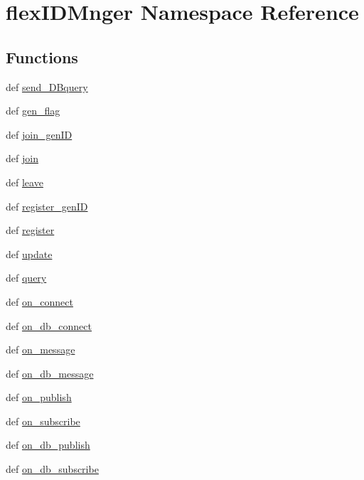 \hypertarget{namespaceflexIDMnger}{\section{flex\-I\-D\-Mnger Namespace Reference}
\label{namespaceflexIDMnger}
}
\subsection*{Functions}
\begin{DoxyCompactItemize}
\item 
def \hyperlink{namespaceflexIDMnger_a2a7c7e9bf32f6eb60a156d39cae2b83e}{send\-\_\-\-D\-Bquery}
\item 
def \hyperlink{namespaceflexIDMnger_aac6ecfc0a2fe51bdd01b61ccd58eb91f}{gen\-\_\-flag}
\item 
def \hyperlink{namespaceflexIDMnger_a0d83ec0ab91ef22408468b11538747d9}{join\-\_\-gen\-I\-D}
\item 
def \hyperlink{namespaceflexIDMnger_a7d48306b9aecbe1ad4aef8c58c6a1690}{join}
\item 
def \hyperlink{namespaceflexIDMnger_a52817e4c22e96db951b167be5d1f2bc5}{leave}
\item 
def \hyperlink{namespaceflexIDMnger_a8da198b7fa1207a7122130fb50adb675}{register\-\_\-gen\-I\-D}
\item 
def \hyperlink{namespaceflexIDMnger_ac74ae56a6ac7c8ce2adc5a2b4da7087d}{register}
\item 
def \hyperlink{namespaceflexIDMnger_adedec16e54018954285353ecad9197db}{update}
\item 
def \hyperlink{namespaceflexIDMnger_adba086fec54959047cafe9f3fefc2bbd}{query}
\item 
def \hyperlink{namespaceflexIDMnger_a8af259aaa589de654cdbe1e50258ff4d}{on\-\_\-connect}
\item 
def \hyperlink{namespaceflexIDMnger_a54882f09152f63c4ca3daa9493e8c6c3}{on\-\_\-db\-\_\-connect}
\item 
def \hyperlink{namespaceflexIDMnger_acafc247773f5ae3f709e0901c753ca9b}{on\-\_\-message}
\item 
def \hyperlink{namespaceflexIDMnger_aaaca9b99b5b33134f1f68152199a34ef}{on\-\_\-db\-\_\-message}
\item 
def \hyperlink{namespaceflexIDMnger_ac3c6578e808a66b6cc9c93a89f7cc590}{on\-\_\-publish}
\item 
def \hyperlink{namespaceflexIDMnger_aabffe64484502208d5e35783b11e2db4}{on\-\_\-subscribe}
\item 
def \hyperlink{namespaceflexIDMnger_a076e57c60c391727cf64ed753fcf73ee}{on\-\_\-db\-\_\-publish}
\item 
def \hyperlink{namespaceflexIDMnger_a3864cbf7d033d1ab035d03390ce3a0ae}{on\-\_\-db\-\_\-subscribe}
\end{DoxyCompactItemize}
